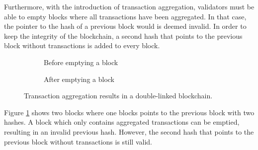 Furthermore, with the introduction of transaction aggregation, validators must be able to empty blocks where all transactions have been aggregated. In that case, the pointer to the hash of a previous block would is deemed invalid. In order to keep the integrity of the blockchain, a second hash that points to the previous block without transactions is added to every block.

\begin{figure}[hbt]
\centering
\begin{subfigure}[b]{0.7\textwidth}
\centering
{}
\caption{Before emptying a block\label{fig:DLBlockchainBefore}}
\end{subfigure}
\par\bigskip
\begin{subfigure}[b]{0.7\textwidth}
\centering
{}
\caption{After emptying a block\label{fig:DLBlockchainAfter}}
\end{subfigure}
\caption{Transaction aggregation results in a double-linked blockchain.}
\end{figure}

Figure \ref{fig:DLBlockchainBefore} shows two blocks where one blocks points to the previous block with two hashes. A block which only contains aggregated transactions can be emptied, resulting in an invalid previous hash. However, the second hash that points to the previous block without transactions is still valid.

